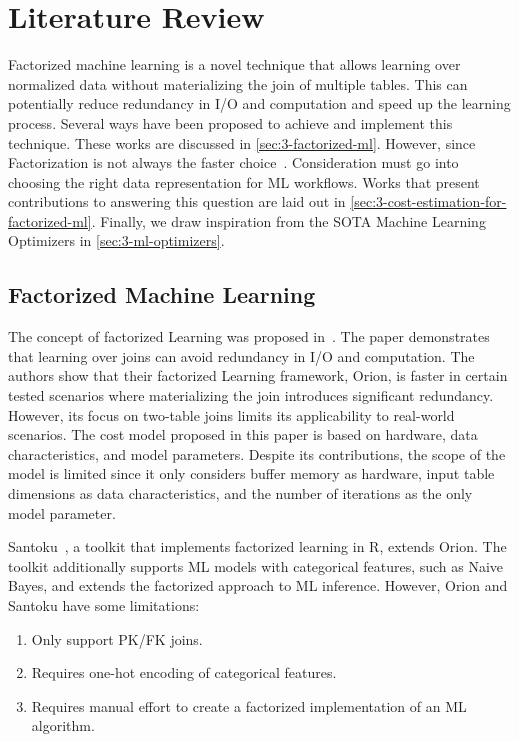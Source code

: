 
\chapter{Literature Review}
\label{chapter:literature}

Factorized machine learning is a novel technique that allows learning over normalized data without materializing the join of multiple tables. This can potentially reduce redundancy in I/O and computation and speed up the learning process. Several ways have been proposed to achieve and implement this technique. These works are discussed in \autoref{sec:3-factorized-ml}. However, since Factorization is not always the faster choice~\cite{orion_learning_gen_lin_models, morpheus, amalur,amalur_tkde24}. Consideration must go into choosing the right data representation for ML workflows. Works that present contributions to answering this question are laid out in \autoref{sec:3-cost-estimation-for-factorized-ml}. Finally, we draw inspiration from the SOTA Machine Learning Optimizers in \autoref{sec:3-ml-optimizers}.

\section{Factorized Machine Learning}
\label{sec:3-factorized-ml}
The concept of factorized Learning was proposed in~\cite{orion_learning_gen_lin_models}. The paper demonstrates that learning over joins can avoid redundancy in I/O and computation. The authors show that their factorized Learning framework, Orion, is faster in certain tested scenarios where materializing the join introduces significant redundancy. However, its focus on two-table joins limits its applicability to real-world scenarios. The cost model proposed in this paper is based on hardware, data characteristics, and model parameters. Despite its contributions, the scope of the model is limited since it only considers buffer memory as hardware, input table dimensions as data characteristics, and the number of iterations as the only model parameter.

Santoku~\cite{santoku_kumar_demonstration_2015}, a toolkit that implements factorized learning in R, extends Orion. The toolkit additionally supports ML models with categorical features, such as Naive Bayes, and extends the factorized approach to ML inference. However, Orion and Santoku have some limitations:

\begin{enumerate}
  \item Only support PK/FK joins.
  \item Requires one-hot encoding of categorical features.
  \item Requires manual effort to create a factorized implementation of an ML algorithm.
\end{enumerate}

